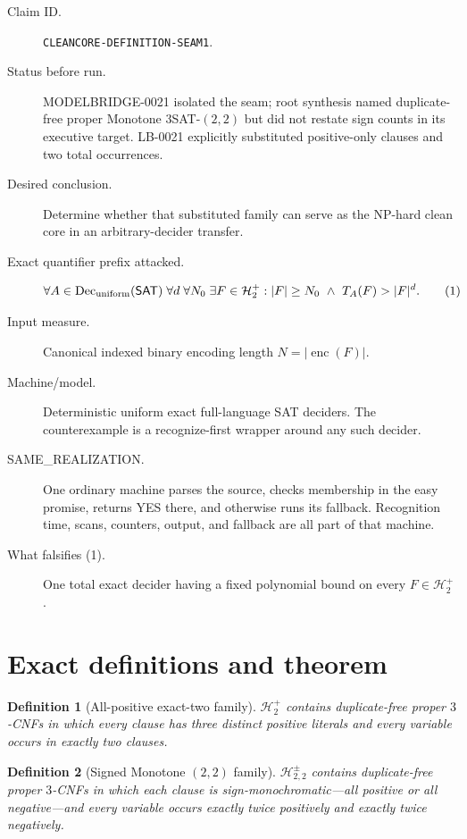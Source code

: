 \documentclass[11pt]{article}
\newtheorem{definition}{Definition}
\newcommand{\SAT}{\mathsf{SAT}}
\newcommand{\Hplus}{\mathcal H^{+}_{2}}
\newcommand{\Hsigned}{\mathcal H^{\pm}_{2,2}}
\begin{document}
\begin{description}
\item[Claim ID.] \texttt{CLEANCORE-DEFINITION-SEAM1}.
\item[Status before run.] MODELBRIDGE-0021 isolated the seam; root synthesis named duplicate-free proper
Monotone $3$SAT-$(2,2)$ but did not restate sign counts in its executive
target.  LB-0021 explicitly substituted positive-only clauses and two total
occurrences.
\item[Desired conclusion.] Determine whether that substituted family can
serve as the NP-hard clean core in an arbitrary-decider transfer.
\item[Exact quantifier prefix attacked.]
\[
 \forall A\in\operatorname{Dec}_{\rm uniform}(\SAT)\;
 \forall d\;\forall N_0\;\exists F\in\Hplus:
 |F|\ge N_0\ \wedge\ T_A(F)>|F|^d.
 \tag{1}
\]
\item[Input measure.] Canonical indexed binary encoding length
$N=|\operatorname{enc}(F)|$.
\item[Machine/model.] Deterministic uniform exact full-language SAT
deciders.  The counterexample is a recognize-first wrapper around any such
decider.
\item[SAME\_REALIZATION.] One ordinary machine parses the source, checks
membership in the easy promise, returns YES there, and otherwise runs its
fallback.  Recognition time, scans, counters, output, and fallback are all
part of that machine.
\item[What falsifies (1).] One total exact decider having a fixed polynomial
bound on every $F\in\Hplus$.
\end{description}

\section{Exact definitions and theorem}

\begin{definition}[All-positive exact-two family]
$\Hplus$ contains duplicate-free proper $3$-CNFs in which every clause has
three distinct positive literals and every variable occurs in exactly two
clauses.
\end{definition}

\begin{definition}[Signed Monotone $(2,2)$ family]
$\Hsigned$ contains duplicate-free proper $3$-CNFs in which each clause is
sign-monochromatic---all positive or all negative---and every variable
occurs exactly twice positively and exactly twice negatively.
\end{definition}
\end{document}
